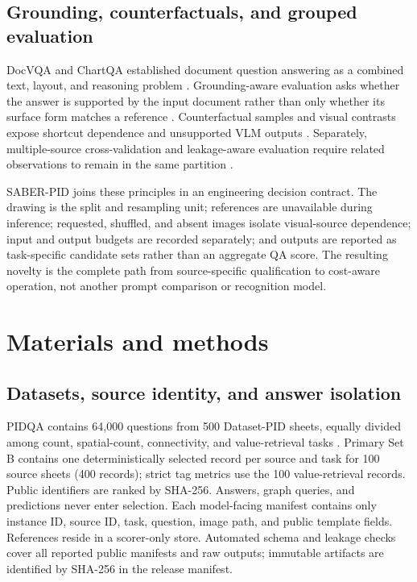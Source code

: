 \documentclass[11pt]{article}
\begin{document}
\subsection{Grounding, counterfactuals, and grouped evaluation}

DocVQA and ChartQA established document question answering as a combined
text, layout, and reasoning problem \cite{mathew2021,masry2022}.
Grounding-aware evaluation asks whether the answer is supported by the input
document rather than only whether its surface form matches a reference
\cite{nourbakhsh2025}. Counterfactual samples and visual contrasts expose
shortcut dependence and unsupported VLM outputs
\cite{chen2020,li2023pope,leng2024}. Separately, multiple-source
cross-validation and leakage-aware evaluation require related observations to
remain in the same partition \cite{geras2013,kapoor2023}.

SABER-PID joins these principles in an engineering decision contract. The
drawing is the split and resampling unit; references are unavailable during
inference; requested, shuffled, and absent images isolate visual-source
dependence; input and output budgets are recorded separately; and outputs are
reported as task-specific candidate sets rather than an aggregate QA score.
The resulting novelty is the complete path from source-specific qualification
to cost-aware operation, not another prompt comparison or recognition model.

\section{Materials and methods}

\subsection{Datasets, source identity, and answer isolation}

PIDQA contains 64,000 questions from 500 Dataset-PID sheets, equally divided
among count, spatial-count, connectivity, and value-retrieval tasks
\cite{gupta2025}. Primary Set B contains one deterministically selected record
per source and task for 100 source sheets (400 records); strict tag metrics use
the 100 value-retrieval records. Public identifiers are ranked by SHA-256.
Answers, graph queries, and predictions never enter selection. Each
model-facing manifest contains only instance ID, source ID, task, question,
image path, and public template fields. References reside in a scorer-only
store. Automated schema and leakage checks cover all reported public manifests
and raw outputs; immutable artifacts are identified by SHA-256 in the release
manifest.
\end{document}
